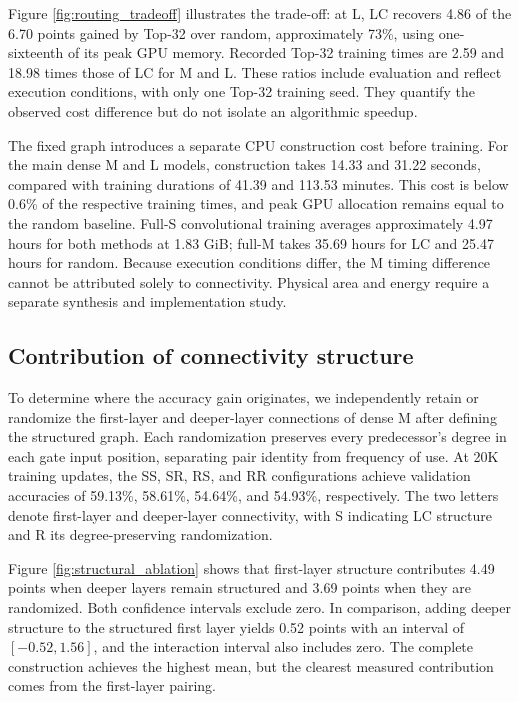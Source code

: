 Figure \ref{fig:routing_tradeoff} illustrates the trade-off: at L, LC recovers 4.86 of the 6.70 points gained by Top-32 over random, approximately 73\%, using one-sixteenth of its peak GPU memory. Recorded Top-32 training times are 2.59 and 18.98 times those of LC for M and L. These ratios include evaluation and reflect execution conditions, with only one Top-32 training seed. They quantify the observed cost difference but do not isolate an algorithmic speedup.

The fixed graph introduces a separate CPU construction cost before training. For the main dense M and L models, construction takes 14.33 and 31.22 seconds, compared with training durations of 41.39 and 113.53 minutes. This cost is below 0.6\% of the respective training times, and peak GPU allocation remains equal to the random baseline. Full-S convolutional training averages approximately 4.97 hours for both methods at 1.83 GiB; full-M takes 35.69 hours for LC and 25.47 hours for random. Because execution conditions differ, the M timing difference cannot be attributed solely to connectivity. Physical area and energy require a separate synthesis and implementation study.

\subsection{Contribution of connectivity structure}

To determine where the accuracy gain originates, we independently retain or randomize the first-layer and deeper-layer connections of dense M after defining the structured graph. Each randomization preserves every predecessor's degree in each gate input position, separating pair identity from frequency of use. At 20K training updates, the SS, SR, RS, and RR configurations achieve validation accuracies of 59.13\%, 58.61\%, 54.64\%, and 54.93\%, respectively. The two letters denote first-layer and deeper-layer connectivity, with S indicating LC structure and R its degree-preserving randomization.



Figure \ref{fig:structural_ablation} shows that first-layer structure contributes 4.49 points when deeper layers remain structured and 3.69 points when they are randomized. Both confidence intervals exclude zero. In comparison, adding deeper structure to the structured first layer yields 0.52 points with an interval of $[-0.52,1.56]$, and the interaction interval also includes zero. The complete construction achieves the highest mean, but the clearest measured contribution comes from the first-layer pairing.

